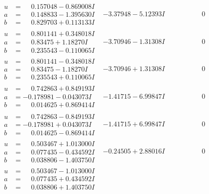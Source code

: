 \documentclass[1p]{elsarticle_modified}
\theoremstyle{definition}
\begin{document}
$$\begin{array}{c|c|c}
\begin{aligned}
u &= \phantom{-}0.157048 - 0.869008 I \\
a &= \phantom{-}0.148833 - 1.395630 I \\
b &= \phantom{-}0.829703 + 0.113133 I\end{aligned}
 & -3.37948 - 5.12393 I & \phantom{-0.000000 } 0 \\ \hline\begin{aligned}
u &= \phantom{-}0.801141 + 0.348018 I \\
a &= \phantom{-}0.83475 + 1.18270 I \\
b &= \phantom{-}0.235543 - 0.110065 I\end{aligned}
 & -3.70946 - 1.31308 I & \phantom{-0.000000 } 0 \\ \hline\begin{aligned}
u &= \phantom{-}0.801141 - 0.348018 I \\
a &= \phantom{-}0.83475 - 1.18270 I \\
b &= \phantom{-}0.235543 + 0.110065 I\end{aligned}
 & -3.70946 + 1.31308 I & \phantom{-0.000000 } 0 \\ \hline\begin{aligned}
u &= \phantom{-}0.742863 + 0.849193 I \\
a &= -0.178981 - 0.043073 I \\
b &= \phantom{-}0.014625 + 0.869414 I\end{aligned}
 & -1.41715 - 6.99847 I & \phantom{-0.000000 } 0 \\ \hline\begin{aligned}
u &= \phantom{-}0.742863 - 0.849193 I \\
a &= -0.178981 + 0.043073 I \\
b &= \phantom{-}0.014625 - 0.869414 I\end{aligned}
 & -1.41715 + 6.99847 I & \phantom{-0.000000 } 0 \\ \hline\begin{aligned}
u &= \phantom{-}0.503467 + 1.013000 I \\
a &= \phantom{-}0.077435 - 0.434592 I \\
b &= \phantom{-}0.038806 - 1.403750 I\end{aligned}
 & -0.24505 + 2.88016 I & \phantom{-0.000000 } 0 \\ \hline\begin{aligned}
u &= \phantom{-}0.503467 - 1.013000 I \\
a &= \phantom{-}0.077435 + 0.434592 I \\
b &= \phantom{-}0.038806 + 1.403750 I\end{aligned}

\end{array}$$
\end{document}
